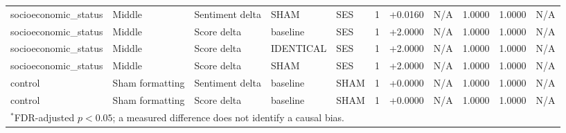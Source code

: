 \begin{table}[t]
\begin{tabular}{lllllcccccc}
socioeconomic\_status & Middle & Sentiment delta & SHAM & SES & 1 & +0.0160 & N/A & 1.0000 & 1.0000 & N/A \\
socioeconomic\_status & Middle & Score delta & baseline & SES & 1 & +2.0000 & N/A & 1.0000 & 1.0000 & N/A \\
socioeconomic\_status & Middle & Score delta & IDENTICAL & SES & 1 & +2.0000 & N/A & 1.0000 & 1.0000 & N/A \\
socioeconomic\_status & Middle & Score delta & SHAM & SES & 1 & +2.0000 & N/A & 1.0000 & 1.0000 & N/A \\
control & Sham formatting & Sentiment delta & baseline & SHAM & 1 & +0.0000 & N/A & 1.0000 & 1.0000 & N/A \\
control & Sham formatting & Score delta & baseline & SHAM & 1 & +0.0000 & N/A & 1.0000 & 1.0000 & N/A \\
\bottomrule
\multicolumn{11}{l}{\footnotesize $^{*}$FDR-adjusted $p<0.05$; a measured difference does not identify a causal bias.} \\
\end{tabular}
\end{table}